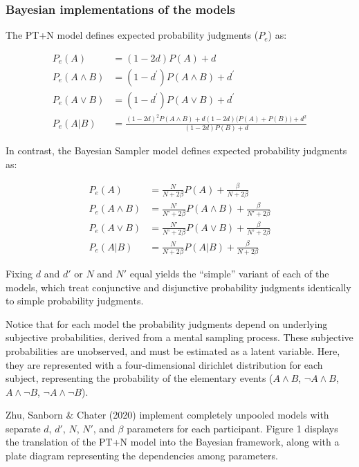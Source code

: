 \documentclass[
  english,
  man,floatsintext]{apa6}
\begin{document}
\hypertarget{bayesian-implementations-of-the-models}{%
\subsubsection{Bayesian implementations of the models}\label{bayesian-implementations-of-the-models}}

The PT+N model defines expected probability judgments (\(P_e\)) as:

\begin{align*}
  P_{e}(A) &= (1-2d)P(A) + d \\
  P_e(A\land B) &= (1-d^\prime)P(A \land B)+d^\prime \\
  P_e(A\lor B) &= (1-d^\prime)P(A \lor B)+d^\prime \\
  P_e(A|B) &= \frac{(1-2d)^2P(A \land B) + d(1-2d)\big(P(A)+P(B)\big)+d^2}{(1-2d)P(B)+d}
\end{align*}

In contrast, the Bayesian Sampler model defines expected probability judgments as:

\begin{align*}
  P_{e}(A) &= \frac{N}{N + 2 \beta}P(A) + \frac{\beta}{N+2 \beta} \\
  P_{e}(A \land B) &= \frac{N’}{N’ + 2 \beta}P(A \land B) + \frac{\beta}{N’+2 \beta} \\
  P_{e}(A \lor B) &= \frac{N’}{N’ + 2 \beta}P(A \lor B) + \frac{\beta}{N’+2 \beta} \\
  P_{e}(A|B) &= \frac{N}{N + 2 \beta}P(A|B) + \frac{\beta}{N+2 \beta}
\end{align*}

Fixing \(d\) and \(d'\) or \(N\) and \(N'\) equal yields the ``simple'' variant of each of the models, which treat conjunctive and disjunctive probability judgments identically to simple probability judgments.

Notice that for each model the probability judgments depend on underlying subjective probabilities, derived from a mental sampling process. These subjective probabilities are unobserved, and must be estimated as a latent variable. Here, they are represented with a four-dimensional dirichlet distribution for each subject, representing the probability of the elementary events (\(A \land B\), \(\neg A \land B\), \(A \land \neg B\), \(\neg A \land \neg B\)).

Zhu, Sanborn \& Chater (2020) implement completely unpooled models with separate \(d\), \(d'\), \(N\), \(N'\), and \(\beta\) parameters for each participant. Figure 1 displays the translation of the PT+N model into the Bayesian framework, along with a plate diagram representing the dependencies among parameters.
\end{document}
